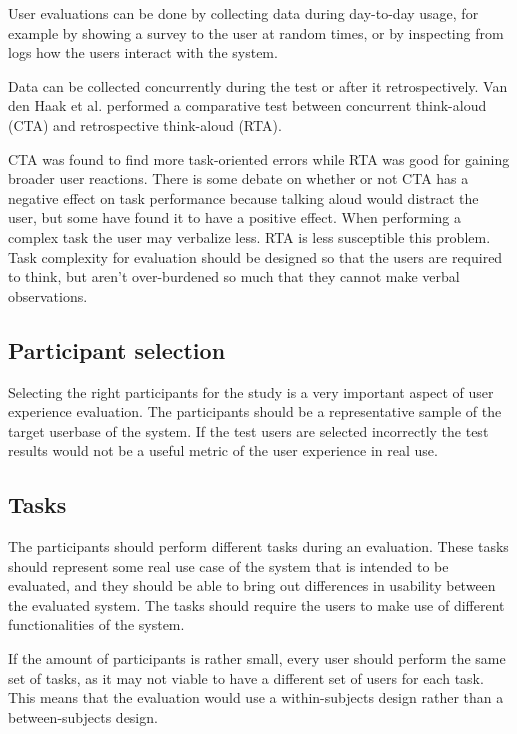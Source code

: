 User evaluations can be done by collecting data during day-to-day usage, for example by showing a survey to the user at random times, or by inspecting from logs how the users interact with the system. \cite{bevanevaluation}

Data can be collected concurrently during the test or after it retrospectively. Van den Haak et al. \cite{van2003retrospective} performed a comparative test between concurrent think-aloud (CTA) and retrospective think-aloud (RTA).

CTA was found to find more task-oriented errors while RTA was good for gaining broader user reactions. There is some debate on whether or not CTA has a negative effect on task performance because talking aloud would distract the user, but some have found it to have a positive effect. When performing a complex task the user may verbalize less. RTA is less susceptible this problem. Task complexity for evaluation should be designed so that the users are required to think, but aren't over-burdened so much that they cannot make verbal observations.

\subsection{Participant selection}
Selecting the right participants for the study is a very important aspect of user experience evaluation. The participants should be a representative sample of the target userbase of the system. If the test users are selected incorrectly the test results would not be a useful metric of the user experience in real use. \cite{rubin2008handbook, albert2013measuring}

\subsection{Tasks}
The participants should perform different tasks during an evaluation. These tasks should represent some real use case of the system that is intended to be evaluated, and they should be able to bring out differences in usability between the evaluated system. The tasks should require the users to make use of different functionalities of the system.

If the amount of participants is rather small, every user should perform the same set of tasks, as it may not viable to have a different set of users for each task. This means that the evaluation would use a within-subjects design rather than a between-subjects design. 

